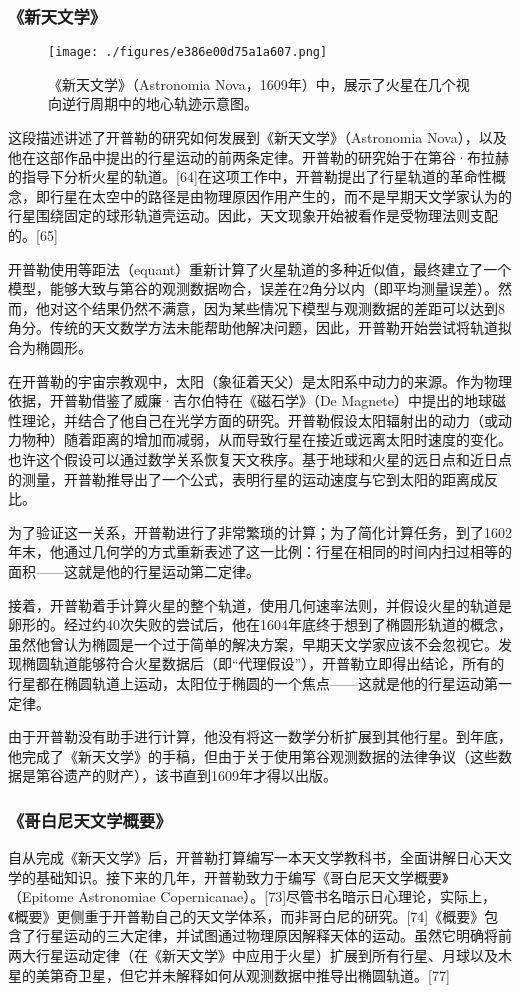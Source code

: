 \subsubsection{《新天文学》}
\begin{figure}[ht]
\centering
\texttt{[image: ./figures/e386e00d75a1a607.png]}
\caption{《新天文学》（Astronomia Nova，1609年）中，展示了火星在几个视向逆行周期中的地心轨迹示意图。} \label{fig_KPL1_12}
\end{figure}
这段描述讲述了开普勒的研究如何发展到《新天文学》（Astronomia Nova），以及他在这部作品中提出的行星运动的前两条定律。开普勒的研究始于在第谷·布拉赫的指导下分析火星的轨道。[64]在这项工作中，开普勒提出了行星轨道的革命性概念，即行星在太空中的路径是由物理原因作用产生的，而不是早期天文学家认为的行星围绕固定的球形轨道壳运动。因此，天文现象开始被看作是受物理法则支配的。[65]

开普勒使用等距法（equant）重新计算了火星轨道的多种近似值，最终建立了一个模型，能够大致与第谷的观测数据吻合，误差在2角分以内（即平均测量误差）。然而，他对这个结果仍然不满意，因为某些情况下模型与观测数据的差距可以达到8角分。传统的天文数学方法未能帮助他解决问题，因此，开普勒开始尝试将轨道拟合为椭圆形。

在开普勒的宇宙宗教观中，太阳（象征着天父）是太阳系中动力的来源。作为物理依据，开普勒借鉴了威廉·吉尔伯特在《磁石学》（De Magnete）中提出的地球磁性理论，并结合了他自己在光学方面的研究。开普勒假设太阳辐射出的动力（或动力物种）随着距离的增加而减弱，从而导致行星在接近或远离太阳时速度的变化。也许这个假设可以通过数学关系恢复天文秩序。基于地球和火星的远日点和近日点的测量，开普勒推导出了一个公式，表明行星的运动速度与它到太阳的距离成反比。

为了验证这一关系，开普勒进行了非常繁琐的计算；为了简化计算任务，到了1602年末，他通过几何学的方式重新表述了这一比例：行星在相同的时间内扫过相等的面积——这就是他的行星运动第二定律。

接着，开普勒着手计算火星的整个轨道，使用几何速率法则，并假设火星的轨道是卵形的。经过约40次失败的尝试后，他在1604年底终于想到了椭圆形轨道的概念，虽然他曾认为椭圆是一个过于简单的解决方案，早期天文学家应该不会忽视它。发现椭圆轨道能够符合火星数据后（即“代理假设”），开普勒立即得出结论，所有的行星都在椭圆轨道上运动，太阳位于椭圆的一个焦点——这就是他的行星运动第一定律。

由于开普勒没有助手进行计算，他没有将这一数学分析扩展到其他行星。到年底，他完成了《新天文学》的手稿，但由于关于使用第谷观测数据的法律争议（这些数据是第谷遗产的财产），该书直到1609年才得以出版。
\subsubsection{《哥白尼天文学概要》} 
自从完成《新天文学》后，开普勒打算编写一本天文学教科书，全面讲解日心天文学的基础知识。接下来的几年，开普勒致力于编写《哥白尼天文学概要》（Epitome Astronomiae Copernicanae）。[73]尽管书名暗示日心理论，实际上，《概要》更侧重于开普勒自己的天文学体系，而非哥白尼的研究。[74]《概要》包含了行星运动的三大定律，并试图通过物理原因解释天体的运动。虽然它明确将前两大行星运动定律（在《新天文学》中应用于火星）扩展到所有行星、月球以及木星的美第奇卫星，但它并未解释如何从观测数据中推导出椭圆轨道。[77]

